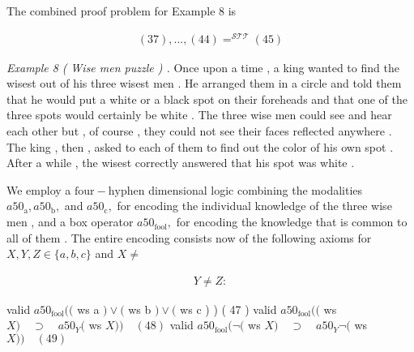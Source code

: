 \documentclass[10pt]{article}
\begin{document}
\newpage
\noindent The combined proof problem for Example 8 is 

\begin{align*}
 (  37  )  ,   .   .   .   ,   (  44  )   = ^{ \mathcal{STT} }  (  45  ) \tag*{$ (  46  ) $}
\end{align*}

\noindent \textit{Example 8 } \quad \textit{( Wise men puzzle ) . } Once upon a time , a king wanted to find the 
 wisest out of his three wisest men . He arranged them in a circle and told them 
 that he would put a white or a black spot on their foreheads and that one of 
 the three spots would certainly be white . The three wise men could see and hear 
 each other but , of course , they could not see their faces reflected anywhere . The 
 king , then , asked to each of them to find out the color of his own spot . After a 
 while , the wisest correctly answered that his spot was white . 

We employ a  $ \mathrm{four-hyphen} $  dimensional logic combining the modalities  $ a50 _{ \mathrm{a} } ,   a50 _{ \mathrm{b} } , $  and  $ a50 _{ \mathrm{c} } , $  
 for encoding the individual knowledge of the three wise men , and a box operator 
  $ a50 _{ \mathrm{fool} } , $  for encoding the knowledge that is common to all of them . The entire 
 encoding consists now of the following axioms for  $ X  ,   Y  ,   Z   \in   \{  a  ,   b  ,   c  \} $  and  $ X   \ne $  

\begin{align*}
 Y   \not=   Z  : 
\end{align*}

valid  $ a50 _{ \mathrm{fool} }  (  ( $  ws a  $ )   \vee   ( $  ws b  $ )   \vee   ( $  ws c ) ) \quad ( 47 ) 
 valid  $ a50 _{ \mathrm{fool} }  (  ( $  ws  $ X  )  \quad  \supset  \quad  a50 _{ Y }  ( $  ws  $ X  )  )  \quad  (  48  ) $  
 valid  $ a50 _{ \mathrm{fool} }  (  \neg   ( $  ws  $ X  )  \quad  \supset  \quad  a50 _{ Y }  \neg   ( $  ws  $ X  )  )  \quad  (  49  ) $  
\end{document}
